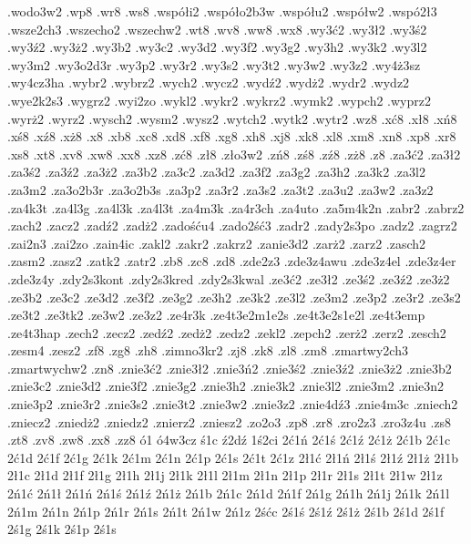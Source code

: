 {.wodo3w2
.wp8
.wr8
.ws8
.wsp\'o\l i2
.wsp\'o\l o2b3w
.wsp\'o\l u2
.wsp\'o\l w2
.wsp\'o2\l 3
.wsze2ch3
.wszecho2
.wszechw2
.wt8
.wv8
.ww8
.wx8
.wy3\'c2
.wy3\l 2
.wy3\'s2
.wy3\'z2
.wy3\.z2
.wy3b2
.wy3c2
.wy3d2
.wy3f2
.wy3g2
.wy3h2
.wy3k2
.wy3l2
.wy3m2
.wy3o2d3r
.wy3p2
.wy3r2
.wy3s2
.wy3t2
.wy3w2
.wy3z2
.wy4\.z3sz
.wy4cz3ha
.wybr2
.wybrz2
.wych2
.wycz2
.wyd\'z2
.wyd\.z2
.wydr2
.wydz2
.wye2k2s3
.wygrz2
.wyi2zo
.wykl2
.wykr2
.wykrz2
.wymk2
.wypch2
.wyprz2
.wyr\.z2
.wyrz2
.wysch2
.wysm2
.wysz2
.wytch2
.wytk2
.wytr2
.wz8
.x\'c8
.x\l 8
.x\'n8
.x\'s8
.x\'z8
.x\.z8
.x8
.xb8
.xc8
.xd8
.xf8
.xg8
.xh8
.xj8
.xk8
.xl8
.xm8
.xn8
.xp8
.xr8
.xs8
.xt8
.xv8
.xw8
.xx8
.xz8
.z\'c8
.z\l 8
.z\l o3w2
.z\'n8
.z\'s8
.z\'z8
.z\.z8
.z8
.za3\'c2
.za3\l 2
.za3\'s2
.za3\'z2
.za3\.z2
.za3b2
.za3c2
.za3d2
.za3f2
.za3g2
.za3h2
.za3k2
.za3l2
.za3m2
.za3o2b3r
.za3o2b3s
.za3p2
.za3r2
.za3s2
.za3t2
.za3u2
.za3w2
.za3z2
.za4k3t
.za4l3g
.za4l3k
.za4l3t
.za4m3k
.za4r3ch
.za4uto
.za5m4k2n
.zabr2
.zabrz2
.zach2
.zacz2
.zad\'z2
.zad\.z2
.zado\'s\'cu4
.zado2\'s\'c3
.zadr2
.zady2s3po
.zadz2
.zagrz2
.zai2n3
.zai2zo
.zain4ic
.zakl2
.zakr2
.zakrz2
.zanie3d2
.zar\.z2
.zarz2
.zasch2
.zasm2
.zasz2
.zatk2
.zatr2
.zb8
.zc8
.zd8
.zde2z3
.zde3z4awu
.zde3z4el
.zde3z4er
.zde3z4y
.zdy2s3kont
.zdy2s3kred
.zdy2s3kwal
.ze3\'c2
.ze3\l 2
.ze3\'s2
.ze3\'z2
.ze3\.z2
.ze3b2
.ze3c2
.ze3d2
.ze3f2
.ze3g2
.ze3h2
.ze3k2
.ze3l2
.ze3m2
.ze3p2
.ze3r2
.ze3s2
.ze3t2
.ze3tk2
.ze3w2
.ze3z2
.ze4r3k
.ze4t3e2m1e2s
.ze4t3e2s1e2l
.ze4t3emp
.ze4t3hap
.zech2
.zecz2
.zed\'z2
.zed\.z2
.zedz2
.zekl2
.zepch2
.zer\.z2
.zerz2
.zesch2
.zesm4
.zesz2
.zf8
.zg8
.zh8
.zimno3kr2
.zj8
.zk8
.zl8
.zm8
.zmartwy2ch3
.zmartwychw2
.zn8
.znie3\'c2
.znie3\l 2
.znie3\'n2
.znie3\'s2
.znie3\'z2
.znie3\.z2
.znie3b2
.znie3c2
.znie3d2
.znie3f2
.znie3g2
.znie3h2
.znie3k2
.znie3l2
.znie3m2
.znie3n2
.znie3p2
.znie3r2
.znie3s2
.znie3t2
.znie3w2
.znie3z2
.znie4d\'z3
.znie4m3c
.zniech2
.zniecz2
.znied\.z2
.zniedz2
.znierz2
.zniesz2
.zo2o3
.zp8
.zr8
.zro2z3
.zro3z4u
.zs8
.zt8
.zv8
.zw8
.zx8
.zz8
\'o1
\'o4w3cz
\'s1c
\'z2d\'z
1\'s2ci
2\'c1\'n
2\'c1\'s
2\'c1\'z
2\'c1\.z
2\'c1b
2\'c1c
2\'c1d
2\'c1f
2\'c1g
2\'c1k
2\'c1m
2\'c1n
2\'c1p
2\'c1s
2\'c1t
2\'c1z
2\l 1\'c
2\l 1\'n
2\l 1\'s
2\l 1\'z
2\l 1\.z
2\l 1b
2\l 1c
2\l 1d
2\l 1f
2\l 1g
2\l 1h
2\l 1j
2\l 1k
2\l 1l
2\l 1m
2\l 1n
2\l 1p
2\l 1r
2\l 1s
2\l 1t
2\l 1w
2\l 1z
2\'n1\'c
2\'n1\l 
2\'n1\'n
2\'n1\'s
2\'n1\'z
2\'n1\.z
2\'n1b
2\'n1c
2\'n1d
2\'n1f
2\'n1g
2\'n1h
2\'n1j
2\'n1k
2\'n1l
2\'n1m
2\'n1n
2\'n1p
2\'n1r
2\'n1s
2\'n1t
2\'n1w
2\'n1z
2\'s\'cc
2\'s1\'s
2\'s1\'z
2\'s1\.z
2\'s1b
2\'s1d
2\'s1f
2\'s1g
2\'s1k
2\'s1p
2\'s1s
}
